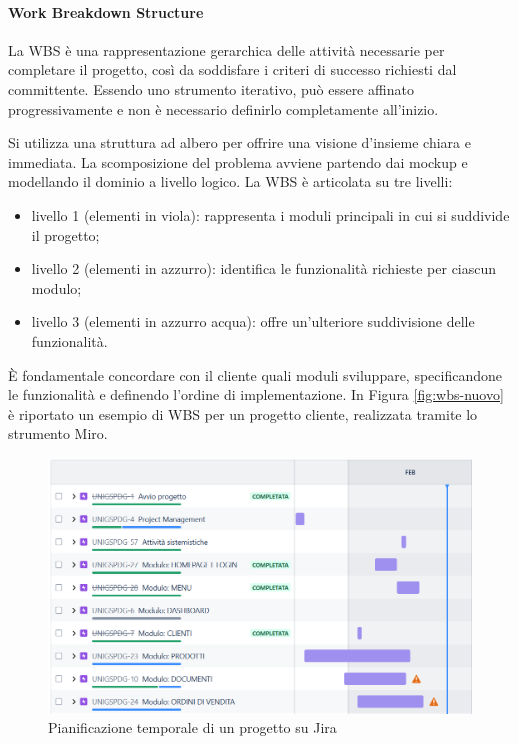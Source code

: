             \paragraph{Work Breakdown Structure}
            La \ac{WBS} è una rappresentazione gerarchica delle attività necessarie per completare il progetto, così da
            soddisfare i criteri di successo richiesti dal committente. Essendo uno
            strumento iterativo, può essere affinato progressivamente e non è necessario definirlo completamente all’inizio.

            Si utilizza una struttura ad albero per offrire una visione d’insieme chiara e immediata. La scomposizione del
            problema avviene partendo dai mockup e modellando il dominio a livello logico. La \ac{WBS} è articolata su tre livelli:
            \begin{itemize}
                \item livello 1 (elementi in viola): rappresenta i moduli principali in cui si suddivide il progetto;
                \item livello 2 (elementi in azzurro): identifica le funzionalità richieste per ciascun modulo;
                \item livello 3 (elementi in azzurro acqua): offre un’ulteriore suddivisione delle funzionalità.
            \end{itemize}
            È fondamentale concordare con il cliente quali moduli sviluppare, specificandone le funzionalità e definendo
            l'ordine di implementazione. In Figura \ref{fig:wbs-nuovo} è riportato un esempio di \ac{WBS} per un progetto cliente,
            realizzata tramite lo strumento Miro.

            \begin{figure}
                \centering
                \includegraphics[scale=0.6]{figures/timelineJiraNuovo.png}
                \caption{Pianificazione temporale di un progetto su Jira}
                \label{fig:timeline-nuovo}
            \end{figure}
